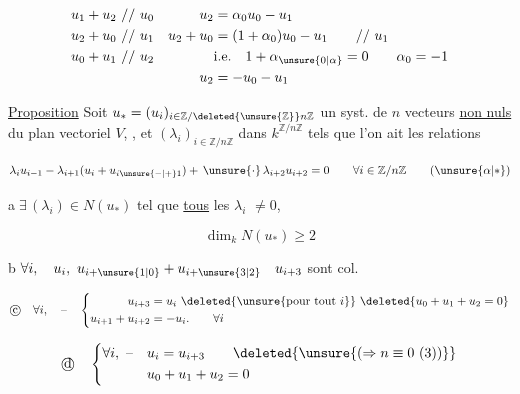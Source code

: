 
\begingroup
\makeatletter
\tagsleft@true
\makeatother

\[
\begin{aligned}
u_1+u_2&\ //\ u_0 &u_2&=\alpha_0u_0-u_1\\
u_2+u_0&\ //\ u_1 &u_2+u_0&=(1+\alpha_0)u_0-u_1\qquad //\ u_1\\
u_0+u_1&\ //\ u_2 &&\text{i.e.}\quad1+\alpha_{\unsure{0|\alpha}}=0\qquad\alpha_0=-1\\
&&u_2&=-u_0-u_1
\end{aligned}
\]

\uline{Proposition} Soit $u_*=(u_i)_{i\in\mathbb Z/\deleted{\unsure{\mathbb Z}}n\mathbb Z}$ un syst. de $n$ vecteurs  \uline{non nuls} du plan vectoriel $V$,  , et   $(\lambda_i)_{i\in\mathbb Z/n\mathbb Z}$ dans $k^{\mathbb Z/n\mathbb Z}$ tels que l'on  ait les relations

\[
\lambda_i u_{i-1}-\lambda_{i+1}(u_i+u_{i\unsure{-|+}1})+\,\unsure{\cdot}\,\lambda_{i+2}u_{i+2}=0
\qquad\forall i\in\mathbb Z/n\mathbb Z \tag*{($\unsure{\alpha|*}$)}
\]

  

 \textcircled{a}\quad $\exists\,(\lambda_i)\in N(u_*)$ tel que \uline{tous} les $\lambda_i$  $\ne0$,   


\[
\dim_k N(u_*)\geq2
\]

\textcircled{b}\quad $\forall i,\quad u_i,\ u_{i+\unsure{1|0}}+u_{i+\unsure{3|2}}\quad u_{i+3}$ sont col.

\[
\text{\textcircled{c}}\quad\forall i,\quad\text{--}\quad
\left\{\begin{aligned}
u_{i+3}&=u_i\ \deleted{\unsure{\text{pour tout }i}}\ \deleted{u_0+u_1+u_2=0}\\
u_{i+1}+u_{i+2}&=-u_i.\qquad \forall i
\end{aligned}\right.
\]

\[
\text{\textcircled{d}}\quad
\left\{\begin{aligned}
\forall i,\ \text{--}\quad &u_i=u_{i+3}\qquad\deleted{\unsure{(\Rightarrow n\equiv0\ (3))}}\\
&u_0+u_1+u_2=0
\end{aligned}\right.
\]

\endgroup

